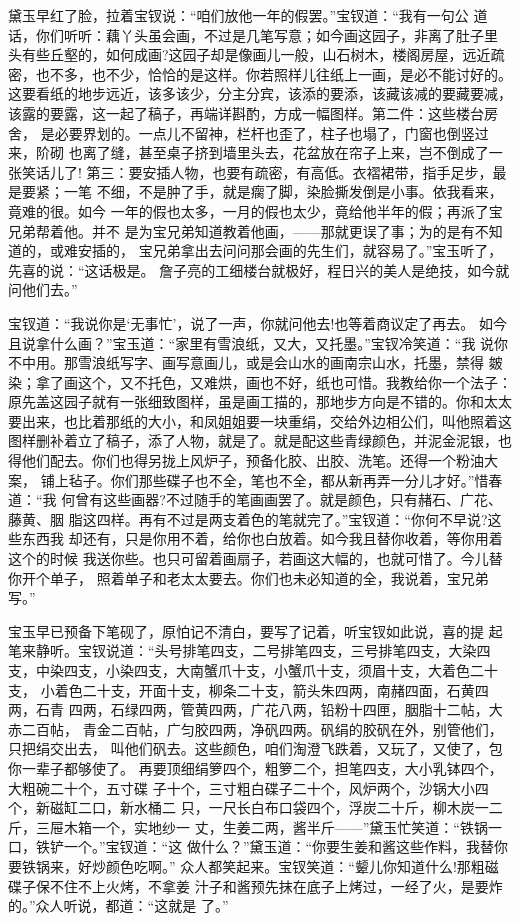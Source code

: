 黛玉早红了脸，拉着宝钗说：“咱们放他一年的假罢。”宝钗道：“我有一句公
道话，你们听听：藕丫头虽会画，不过是几笔写意；如今画这园子，非离了肚子里
头有些丘壑的，如何成画?这园子却是像画儿一般，山石树木，楼阁房屋，远近疏
密，也不多，也不少，恰恰的是这样。你若照样儿往纸上一画，是必不能讨好的。
这要看纸的地步远近，该多该少，分主分宾，该添的要添，该藏该减的要藏要减，
该露的要露，这一起了稿子，再端详斟酌，方成一幅图样。第二件：这些楼台房舍，
是必要界划的。一点儿不留神，栏杆也歪了，柱子也塌了，门窗也倒竖过来，阶砌
也离了缝，甚至桌子挤到墙里头去，花盆放在帘子上来，岂不倒成了一张笑话儿了!
第三：要安插人物，也要有疏密，有高低。衣褶裙带，指手足步，最是要紧；一笔
不细，不是肿了手，就是瘸了脚，染脸撕发倒是小事。依我看来，竟难的很。如今
一年的假也太多，一月的假也太少，竟给他半年的假；再派了宝兄弟帮着他。并不
是为宝兄弟知道教着他画，——那就更误了事；为的是有不知道的，或难安插的，
宝兄弟拿出去问问那会画的先生们，就容易了。”宝玉听了，先喜的说：“这话极是。
詹子亮的工细楼台就极好，程日兴的美人是绝技，如今就问他们去。”

宝钗道：“我说你是‘无事忙’，说了一声，你就问他去!也等着商议定了再去。
如今且说拿什么画？”宝玉道：“家里有雪浪纸，又大，又托墨。”宝钗冷笑道：“我
说你不中用。那雪浪纸写字、画写意画儿，或是会山水的画南宗山水，托墨，禁得
皴染；拿了画这个，又不托色，又难烘，画也不好，纸也可惜。我教给你一个法子：
原先盖这园子就有一张细致图样，虽是画工描的，那地步方向是不错的。你和太太
要出来，也比着那纸的大小，和凤姐姐要一块重绢，交给外边相公们，叫他照着这
图样删补着立了稿子，添了人物，就是了。就是配这些青绿颜色，并泥金泥银，也
得他们配去。你们也得另拢上风炉子，预备化胶、出胶、洗笔。还得一个粉油大案，
铺上毡子。你们那些碟子也不全，笔也不全，都从新再弄一分儿才好。”惜春道：“我
何曾有这些画器?不过随手的笔画画罢了。就是颜色，只有赭石、广花、藤黄、胭
脂这四样。再有不过是两支着色的笔就完了。”宝钗道：“你何不早说?这些东西我
却还有，只是你用不着，给你也白放着。如今我且替你收着，等你用着这个的时候
我送你些。也只可留着画扇子，若画这大幅的，也就可惜了。今儿替你开个单子，
照着单子和老太太要去。你们也未必知道的全，我说着，宝兄弟写。”

宝玉早已预备下笔砚了，原怕记不清白，要写了记着，听宝钗如此说，喜的提
起笔来静听。宝钗说道：“头号排笔四支，二号排笔四支，三号排笔四支，大染四
支，中染四支，小染四支，大南蟹爪十支，小蟹爪十支，须眉十支，大着色二十支，
小着色二十支，开面十支，柳条二十支，箭头朱四两，南赭四面，石黄四两，石青
四两，石绿四两，管黄四两，广花八两，铅粉十四匣，胭脂十二帖，大赤二百帖，
青金二百帖，广匀胶四两，净矾四两。矾绢的胶矾在外，别管他们，只把绢交出去，
叫他们矾去。这些颜色，咱们淘澄飞跌着，又玩了，又使了，包你一辈子都够使了。
再要顶细绢箩四个，粗箩二个，担笔四支，大小乳钵四个，大粗碗二十个，五寸碟
子十个，三寸粗白碟子二十个，风炉两个，沙锅大小四个，新磁缸二口，新水桶二
只，一尺长白布口袋四个，浮炭二十斤，柳木炭一二斤，三屉木箱一个，实地纱一
丈，生姜二两，酱半斤——”黛玉忙笑道：“铁锅一口，铁铲一个。”宝钗道：“这
做什么？”黛玉道：“你要生姜和酱这些作料，我替你要铁锅来，好炒颜色吃啊。”
众人都笑起来。宝钗笑道：“颦儿你知道什么!那粗磁碟子保不住不上火烤，不拿姜
汁子和酱预先抹在底子上烤过，一经了火，是要炸的。”众人听说，都道：“这就是
了。”

